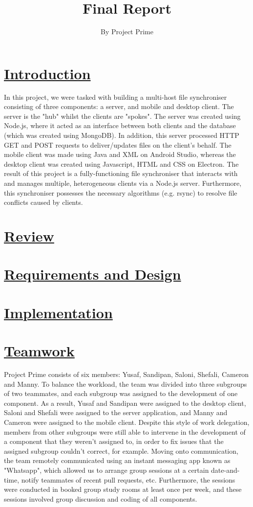 \documentclass{article}
\title{Final Report}
\author{By Project Prime}
\begin{document}
  \maketitle
 \section{\underline{Introduction}}
In this project, we were tasked with building a multi-host file synchroniser consisting of three components: a server, and mobile and desktop client. The server is the "hub" whilst the clients are "spokes". The server was created using Node.js, where it acted as an interface between both clients and the database (which was created using MongoDB). In addition, this server processed HTTP GET and POST requests to deliver/updates files on the client's behalf. The mobile client was made using Java and XML on Android Studio, whereas the desktop client was created using Javascript, HTML and CSS on Electron. The result of this project is a fully-functioning file synchroniser that interacts with and manages multiple, heterogeneous clients via a Node.js server. Furthermore, this synchroniser possesses the necessary algorithms (e.g. rsync) to resolve file conflicts caused by clients. 

\section{\underline{Review}}

\section{\underline{Requirements and Design}}

\section{\underline{Implementation}}

\section{\underline{Teamwork}}
Project Prime consists of six members: Yusaf, Sandipan, Saloni, Shefali, Cameron and Manny. To balance the workload, the team was divided into three subgroups of two teammates, and each subgroup was assigned to the development of one component. As a result, Yusaf and Sandipan were assigned to the desktop client, Saloni and Shefali were assigned to the server application, and Manny and Cameron were assigned to the mobile client. Despite this style of work delegation, members from other subgroups were still able to intervene in the development of a component that they weren't assigned to, in order to fix issues that the assigned subgroup couldn't correct, for example. Moving onto communication, the team remotely communicated using an instant messaging app known as "Whatsapp", which allowed us to arrange group sessions at a certain date-and-time, notify teammates of recent pull requests, etc. Furthermore, the sessions were conducted in booked group study rooms at least once per week, and these sessions involved group discussion and coding of all components. 
\end{document}
